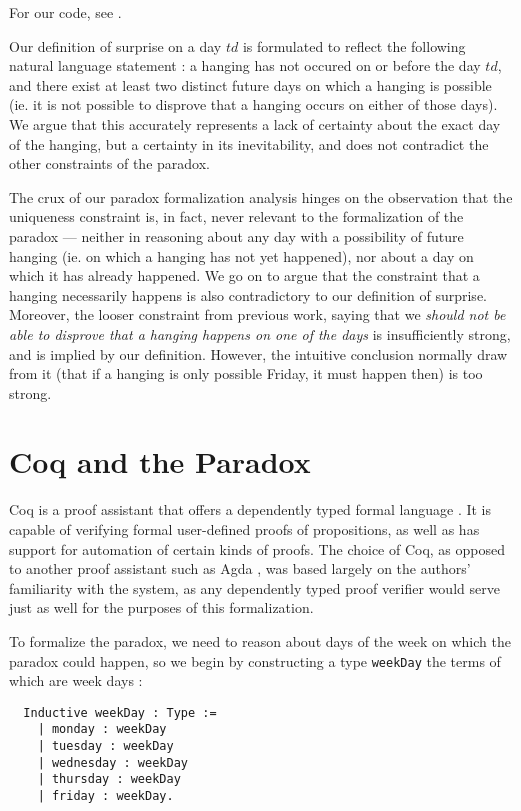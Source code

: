 \documentclass[journal]{journal}
\begin{document}
For our code, see \cite{gitunexpect}.

Our definition of surprise on a day $td$ is formulated to reflect
the following natural language statement : a hanging has not occured on or before the day $td$,
and there exist at least two distinct future days on which a hanging
is possible (ie. it is not possible to disprove that a hanging occurs on either
of those days).
We argue that this accurately represents a lack of certainty about the exact day of
the hanging, but a certainty in its inevitability, and does not contradict
the other constraints of the paradox.

The crux of our paradox formalization analysis hinges on the observation that the uniqueness constraint
  is, in fact, never relevant to the formalization of the paradox --- neither in reasoning about
  any day with a possibility of future hanging (ie. on which
  a hanging has not yet happened), nor about a day on which it has already happened.
  We go on to argue that the constraint that a hanging necessarily happens is
   also contradictory to our definition of surprise. Moreover, the looser constraint
  from previous work,
  saying that we \emph{should not be able to disprove that a hanging happens on one of the
  days} is insufficiently strong, and is implied by our definition. However, the intuitive conclusion normally draw from it
  (that if a hanging is only possible Friday, it must happen then)
  is too strong.


\section{Coq and the Paradox}
\label{sec:form}

Coq is a proof assistant that offers a dependently typed formal language \cite{coq}.
It is capable of verifying formal user-defined proofs of propositions, as well as has support
for automation of certain kinds of proofs. The choice of Coq, as opposed to another
proof assistant such as Agda \cite{agda}, was based largely on the authors' familiarity with the system,
as any dependently typed proof verifier would serve just as well for the purposes of this formalization.

To formalize the paradox, we need to reason about days of the week on which
the paradox could happen, so we
begin by constructing a type {\tt weekDay} the terms of which are week days :

\begin{lstlisting}
  Inductive weekDay : Type :=
    | monday : weekDay
    | tuesday : weekDay
    | wednesday : weekDay
    | thursday : weekDay
    | friday : weekDay.
\end{lstlisting}
\end{document}
